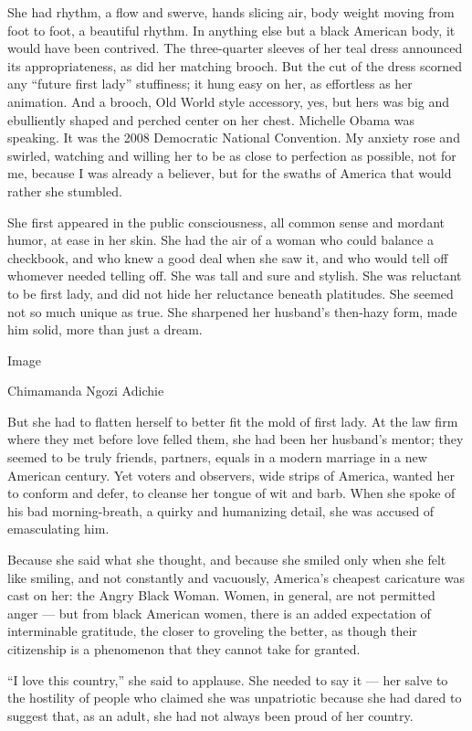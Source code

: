 She had rhythm, a flow and swerve, hands slicing air, body weight moving
from foot to foot, a beautiful rhythm. In anything else but a black
American body, it would have been contrived. The three-quarter sleeves
of her teal dress announced its appropriateness, as did her matching
brooch. But the cut of the dress scorned any ``future first lady''
stuffiness; it hung easy on her, as effortless as her animation. And a
brooch, Old World style accessory, yes, but hers was big and ebulliently
shaped and perched center on her chest. Michelle Obama was speaking. It
was the 2008 Democratic National Convention. My anxiety rose and
swirled, watching and willing her to be as close to perfection as
possible, not for me, because I was already a believer, but for the
swaths of America that would rather she stumbled.

She first appeared in the public consciousness, all common sense and
mordant humor, at ease in her skin. She had the air of a woman who could
balance a checkbook, and who knew a good deal when she saw it, and who
would tell off whomever needed telling off. She was tall and sure and
stylish. She was reluctant to be first lady, and did not hide her
reluctance beneath platitudes. She seemed not so much unique as true.
She sharpened her husband's then-hazy form, made him solid, more than
just a dream.

Image

Chimamanda Ngozi Adichie

But she had to flatten herself to better fit the mold of first lady. At
the law firm where they met before love felled them, she had been her
husband's mentor; they seemed to be truly friends, partners, equals in a
modern marriage in a new American century. Yet voters and observers,
wide strips of America, wanted her to conform and defer, to cleanse her
tongue of wit and barb. When she spoke of his bad morning-breath, a
quirky and humanizing detail, she was accused of emasculating him.

Because she said what she thought, and because she smiled only when she
felt like smiling, and not constantly and vacuously, America's cheapest
caricature was cast on her: the Angry Black Woman. Women, in general,
are not permitted anger --- but from black American women, there is an
added expectation of interminable gratitude, the closer to groveling the
better, as though their citizenship is a phenomenon that they cannot
take for granted.

``I love this country,'' she said to applause. She needed to say it ---
her salve to the hostility of people who claimed she was unpatriotic
because she had dared to suggest that, as an adult, she had not always
been proud of her country.

